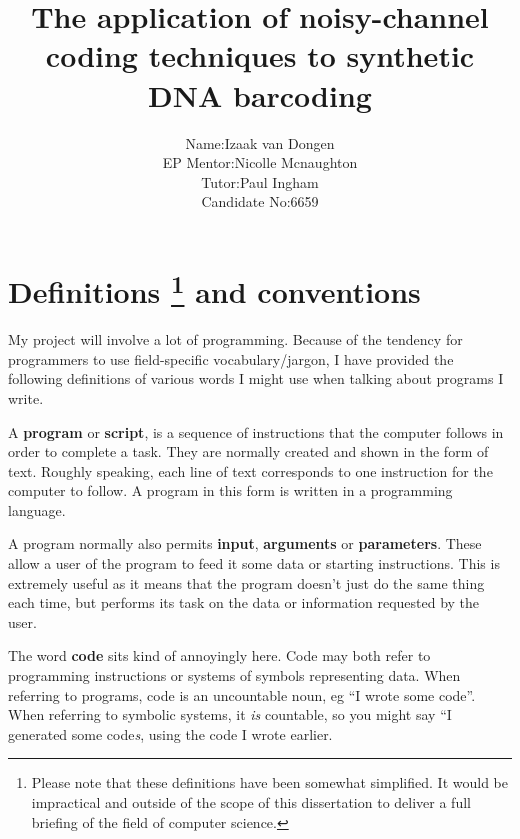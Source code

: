 \documentclass[a4paper,11pt]{article}
\title{The application of noisy-channel coding techniques to synthetic DNA barcoding}
\author{\begin{tabular}{rl}
                Name:& Izaak van Dongen\\
           EP Mentor:& Nicolle Mcnaughton\\
               Tutor:& Paul Ingham\\
        Candidate No:&  6659\\
        \end{tabular}
        }
\begin{document}
    \maketitle\thispagestyle{empty} %
    \tableofcontents
    \listoflistings
    \listoffigures
    \listoftables



    \section[Definitions and conventions]{Definitions \footnote{Please note that
    these definitions have been somewhat simplified. It would be impractical and
    outside of the scope of this dissertation to deliver a full briefing of
    the field of computer science.} and conventions}

    My project will involve a lot of programming. Because of the tendency for
    programmers to use field-specific vocabulary/jargon, I have provided the
    following definitions of various words I might use when talking about
    programs I write.

    \begin{definition}
    A \textbf{program} or \textbf{script}, is a sequence of instructions that the
    computer follows in order to complete a task. They are normally created and
    shown in the form of text. Roughly speaking, each line of text corresponds
    to one instruction for the computer to follow. A program in this form is
    written in a programming language.
    \end{definition}

    \begin{definition}
    A program normally also permits \textbf{input}, \textbf{arguments} or
    \textbf{parameters}. These allow a user of the program to feed it some data
    or starting instructions. This is extremely useful as it means that the
    program doesn't just do the same thing each time, but performs its task on
    the data or information requested by the user.
    \end{definition}

    \begin{definition}
    The word \textbf{code} sits kind of annoyingly here. Code may both refer to
    programming instructions or systems of symbols representing data. When
    referring to programs, code is an uncountable noun, eg ``I wrote some
    code''. When referring to symbolic systems, it \textit{is} countable, so you
    might say ``I generated some code\textit{s}, using the code I wrote earlier.
    \end{definition}
\end{document}
